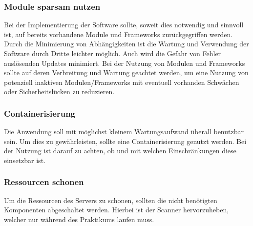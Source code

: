 \subsubsection{Module sparsam nutzen}
Bei der Implementierung der Software sollte, soweit dies notwendig und sinnvoll ist, auf bereits vorhandene Module und Frameworks zurückgegriffen werden. Durch die Minimierung von Abhängigkeiten ist die Wartung und Verwendung der Software durch Dritte leichter möglich. Auch wird die Gefahr von Fehler auslösenden Updates minimiert. Bei der Nutzung von Modulen und Frameworks sollte auf deren Verbreitung und Wartung geachtet werden, um eine Nutzung von potenziell inaktiven Modulen/Frameworks mit eventuell vorhanden Schwächen oder Sicherheitslücken zu reduzieren.

\subsubsection{Containerisierung}
Die Anwendung soll mit möglichst kleinem Wartungsaufwand überall benutzbar sein. Um dies zu gewährleisten, sollte eine Containerisierung genutzt werden. Bei der Nutzung ist darauf zu achten, ob und mit welchen Einschränkungen diese einsetzbar ist.

\subsubsection{Ressourcen schonen}
Um die Ressourcen des Servers zu schonen, sollten die nicht benötigten Komponenten abgeschaltet werden. Hierbei ist der Scanner hervorzuheben, welcher nur während des Praktikums laufen muss. 